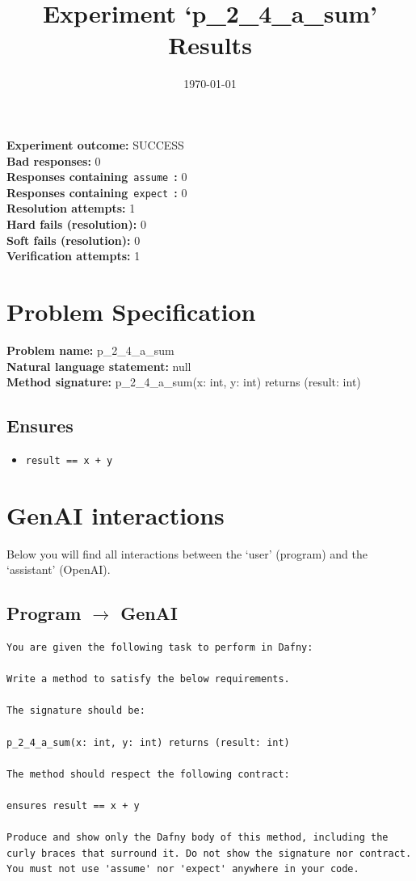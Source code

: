 \documentclass{article}
\begin{document}
\title{Experiment `p\_2\_4\_a\_sum' Results}
\author{\today}
\date{}
\maketitle
\textbf{Experiment outcome: }SUCCESS
\\\textbf{Bad responses: }0
\\\textbf{Responses containing}~\texttt{assume}~\textbf{: }0
\\\textbf{Responses containing}~\texttt{expect}~\textbf{: }0
\\\textbf{Resolution attempts: }1
\\\textbf{Hard fails (resolution): }0
\\\textbf{Soft fails (resolution): }0
\\\textbf{Verification attempts: }1
\section*{Problem Specification}
\textbf{Problem name: }p\_2\_4\_a\_sum
\\\textbf{Natural language statement: }null
\\\textbf{Method signature: }p\_2\_4\_a\_sum(x: int, y: int) returns (result: int)
\subsection*{Ensures}
\begin{itemize}
\item \texttt{result == x + y}
\end{itemize}
\clearpage
\section*{GenAI interactions}
Below you will find all interactions between the `user' (program) and the `assistant' (OpenAI).
\subsection*{Program $\rightarrow$ GenAI}
\begin{lstlisting}
You are given the following task to perform in Dafny:

Write a method to satisfy the below requirements.

The signature should be:

p_2_4_a_sum(x: int, y: int) returns (result: int)

The method should respect the following contract:

ensures result == x + y

Produce and show only the Dafny body of this method, including the curly braces that surround it. Do not show the signature nor contract. You must not use 'assume' nor 'expect' anywhere in your code.
\end{lstlisting}
\end{document}
